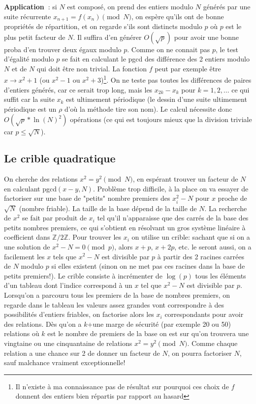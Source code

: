 \documentclass[a4paper,11pt]{article}
\newcommand{\Z}{{\mathbb{Z}}}
\begin{document}
\begin{giacjshere}
{\bf Application~}: si $N$ est composé, on prend des entiers modulo $N$
générés par une suite 
récurrente $x_{n+1}=f(x_n) \pmod N$, 
on espère qu'ils ont de bonne propriétés de répartition, 
et on regarde s'ils sont distincts modulo $p$ où $p$ est 
le plus petit facteur de $N$. Il suffira d'en générer 
$O(\sqrt{p})$ pour avoir une bonne proba d'en trouver 
deux égaux modulo $p$. 
Comme on ne connait pas $p$, le test d'égalité modulo $p$ 
se fait en calculant le pgcd des différence des 2 entiers modulo $N$
et de $N$ qui doit être non trivial. 
La fonction $f$ peut par exemple être $x \rightarrow x^2+1$ 
(ou $x^2-1$ ou $x^2+3$)\footnote{Il n'existe \`a ma connaissance
pas de résultat sur pourquoi ces choix de $f$ donnent 
des entiers bien répartis par rapport au hasard}. 
On ne teste pas toutes les différences de paires d'entiers générés,
car ce serait trop long,
mais les $x_{2k}-x_k$ pour $k=1,2,...$ 
ce qui suffit car la suite $x_k$ est ultimement périodique 
(le dessin d'une suite ultimement p\'eriodique est un $\rho$
d'o\`u la m\'ethode tire son nom). 
Le calcul nécessite donc $O(\sqrt{p}*\ln(N)^2)$ opérations 
(ce qui est toujours mieux que la division triviale car $p \leq \sqrt{N}$).

\subsection{Le crible quadratique}
On cherche des relations $x^2=y^2 \pmod N$, en espérant trouver un
facteur de $N$  en calculant pgcd$(x-y,N)$.
Problème trop difficile, à la place on va essayer de factoriser sur
une base de "petits" nombre premiers des $x_i^2-N$ pour $x$ 
proche de $\sqrt{N}$ (nombre friable). 
La taille de la base dépend de la taille de $N$. 
La recherche de $x^2$ se fait par produit de $x_i$ 
tel qu'il n'apparaisse que des carrés de la base des petits 
nombres premiers, ce qui s'obtient en résolvant 
un gros système linéaire à coefficient dans $\Z/2\Z$.
Pour trouver les $x_i$ on utilise un crible: 
sachant que si on a une solution de $x^2-N=0 \pmod p$, 
alors $x+p$, $x+2p$, etc. le seront aussi, on a facilement les $x$ 
tels que $x^2-N$ est divisible par $p$ à partir des 2 racines carrées 
de $N$ modulo $p$ si elles existent 
(sinon on ne met pas ces racines dans la base de petits premiers!). 
Le crible consiste à incrémenter de $\log(p)$ 
tous les éléments d'un tableau dont l'indice correspond 
à un $x$ tel que $x^2-N$ est divisible par $p$. 
Lorsqu'on a parcouru tous les premiers de la base de nombres premiers, 
on regarde dans le tableau les valeurs assez grandes 
vont correspondre à des possibilités d'entiers friables, 
on factorise alors les $x_i$ correspondants pour avoir des relations. 
Dès qu'on a $k$+une marge de sécurité (par exemple 20 ou 50) 
relations où $k$ est le nombre de premiers de la base 
on est sur qu'on trouvera une vingtaine ou une cinquantaine de
relations 
$x^2=y^2 \pmod N$. 
Comme chaque relation a une chance sur 2 de donner un facteur de $N$, 
on pourra factoriser $N$, sauf malchance vraiment exceptionnelle!


\end{giacjshere}
\end{document}
